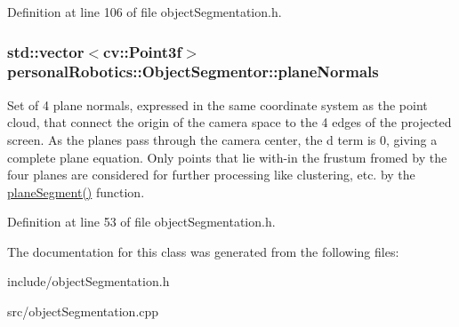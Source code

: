 Definition at line 106 of file object\+Segmentation.\+h.

\hypertarget{classpersonal_robotics_1_1_object_segmentor_a2d9b43c69441221cd4b03b61da1ba1ae}{}
\subsubsection[{plane\+Normals}]{\setlength{\rightskip}{0pt plus 5cm}std\+::vector$<$cv\+::\+Point3f$>$ personal\+Robotics\+::\+Object\+Segmentor\+::plane\+Normals\hspace{0.3cm}{\ttfamily [protected]}}\label{classpersonal_robotics_1_1_object_segmentor_a2d9b43c69441221cd4b03b61da1ba1ae}
Set of 4 plane normals, expressed in the same coordinate system as the point cloud, that connect the origin of the camera space to the 4 edges of the projected screen. As the planes pass through the camera center, the d term is 0, giving a complete plane equation. Only points that lie with-\/in the frustum fromed by the four planes are considered for further processing like clustering, etc. by the \hyperlink{classpersonal_robotics_1_1_object_segmentor_ad2e4795303539fb1cdd9408730e446cc}{plane\+Segment()} function. 

Definition at line 53 of file object\+Segmentation.\+h.



The documentation for this class was generated from the following files\+:\begin{DoxyCompactItemize}
\item 
include/object\+Segmentation.\+h\item 
src/object\+Segmentation.\+cpp\end{DoxyCompactItemize}
